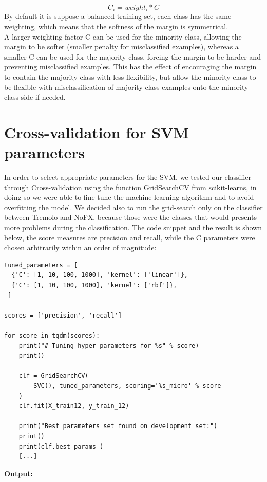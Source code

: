 \documentclass{article}
\begin{document}
$$C_i = weight_i * C$$
By default it is suppose a balanced training-set, each class has the same weighting, which means that the softness of the margin is symmetrical.\\ A larger weighting factor C can be used for the minority class, allowing the margin to be softer (smaller penalty for misclassified examples), whereas a smaller C can be used for the majority class, forcing the margin to be harder and preventing misclassified examples.
This has the effect of encouraging the margin to contain the majority class with less flexibility, but allow the minority class to be flexible with misclassification of majority class examples onto the minority class side if needed.

\section{Cross-validation for SVM parameters}
In order to select appropriate parameters for the SVM, we tested our classifier through Cross-validation using the function GridSearchCV from scikit-learns, in doing so we were able to fine-tune the machine learning algorithm and to avoid overfitting the model. We decided also to run the grid-search only on the classifier between Tremolo and NoFX, because those were the classes that would presents more problems during the classification. The code snippet and the result is shown below, the score measures are precision and recall, while the C parameters were chosen arbitrarily within an order of magnitude:
\begin{verbatim}
tuned_parameters = [
  {'C': [1, 10, 100, 1000], 'kernel': ['linear']},
  {'C': [1, 10, 100, 1000], 'kernel': ['rbf']},
 ]

scores = ['precision', 'recall']

for score in tqdm(scores):
    print("# Tuning hyper-parameters for %s" % score)
    print()

    clf = GridSearchCV(
        SVC(), tuned_parameters, scoring='%s_micro' % score
    )
    clf.fit(X_train12, y_train_12)

    print("Best parameters set found on development set:")
    print()
    print(clf.best_params_)
    [...]
\end{verbatim}
\hfill \break
\textbf{Output:}
\end{document}
